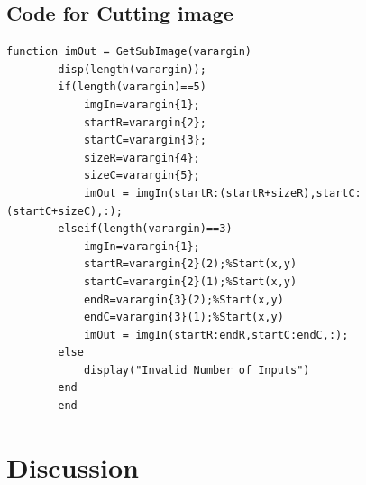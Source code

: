 \documentclass[a4paper,11pt]{article}
\begin{document}
\subsection{Code for Cutting image}
\lstset{language = Matlab}
    \begin{lstlisting}[basicstyle=\tiny]
        function imOut = GetSubImage(varargin)
        disp(length(varargin));
        if(length(varargin)==5)
            imgIn=varargin{1};
            startR=varargin{2};
            startC=varargin{3};
            sizeR=varargin{4};
            sizeC=varargin{5};
            imOut = imgIn(startR:(startR+sizeR),startC:(startC+sizeC),:);
        elseif(length(varargin)==3)
            imgIn=varargin{1};
            startR=varargin{2}(2);%Start(x,y)
            startC=varargin{2}(1);%Start(x,y)
            endR=varargin{3}(2);%Start(x,y)
            endC=varargin{3}(1);%Start(x,y)
            imOut = imgIn(startR:endR,startC:endC,:);
        else
            display("Invalid Number of Inputs")
        end
        end
\end{lstlisting}

\section{Discussion}
\end{document}

